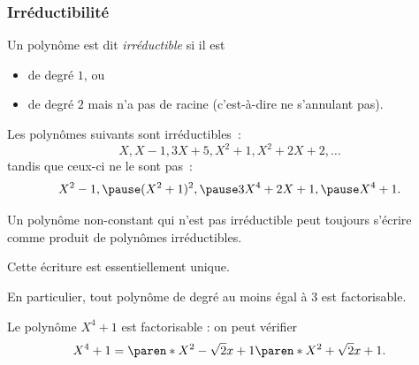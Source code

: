 \subsubsection{Irréductibilité}
\begin{frame}
\begin{definition}
  Un polynôme est dit \emph{irréductible} si il est
  \begin{itemize}
  \item de degré \(1\), ou
  \item de degré \(2\) mais n'a pas de racine (c'est-à-dire ne s'annulant pas).
  \end{itemize}
\end{definition}\pause{}
\begin{example}
  Les polynômes suivants sont irréductibles~:\pause{}
  \begin{equation*}
    X, X-1, 3 X + 5, X^{2} + 1, X^{2} + 2 X + 2, \ldots
  \end{equation*}\pause{}
  tandis que ceux-ci ne le sont pas~:\pause{}
  \begin{equation*}
    X^{2} - 1,\pause (X^{2} + 1)^{2},\pause 3 X^{4} + 2 X + 1,\pause X^{4} + 1.
  \end{equation*}\pause{}
\end{example}
\end{frame}
\begin{frame}
  \begin{proposition}
    Un polynôme non-constant qui n'est pas irréductible peut toujours s'écrire comme produit de polynômes irréductibles.
  \end{proposition}\pause{}
  \begin{remark*}
    Cette écriture est essentiellement unique.
  \end{remark*}\pause{}

  \begin{remark*}
    En particulier, tout polynôme de degré au moins égal à \(3\) est factorisable.
  \end{remark*}\pause{}
  \begin{example}Le polynôme \(X^{4}+ 1\) est factorisable : on peut vérifier\pause{}
    \begin{equation*}
      X^{4} + 1 = \paren*{X^{2}- \sqrt 2 x + 1}\paren*{X^{2}+ \sqrt 2 x + 1}.
    \end{equation*}
  \end{example}
\end{frame}

